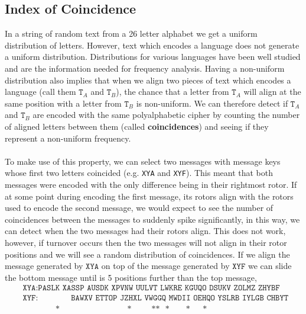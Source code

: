 \subsection{Index of Coincidence}
In a string of random text from a 26 letter alphabet we get a uniform distribution of letters. However, text which encodes a language does not generate a uniform distribution. Distributions for various languages have been well studied and are the information needed for frequency analysis. Having a non-uniform distribution also implies that when we align two pieces  of text which encodes a language (call them $\texttt{T}_A$ and $\texttt{T}_B$), the chance that a letter from $\texttt{T}_A$ will align at the same position with a letter from $\texttt{T}_B$ is non-uniform. We can therefore detect if  $\texttt{T}_A$ and $\texttt{T}_B$ are encoded with the same polyalphabetic cipher by counting the number of aligned letters between them (called {\bf{coincidences}}) and seeing if they represent a non-uniform frequency.
\\\\To make use of this property, we can select two messages with message keys whose first two letters coincided (e.g. \texttt{XYA} and \texttt{XYF}). This meant that both messages were encoded with the only difference being in their rightmost rotor. If at some point during encoding the first message, its rotors align with the rotors used to encode the second message, we would expect to see the number of coincidences between the messages to suddenly spike significantly, in this way, we can detect when the two messages had their rotors align. This does not work, however, if turnover occurs then the two messages will not align in their rotor positions and we will see a random distribution of coincidences. If we align the message generated by $\texttt{XYA}$ on top of the message generated by $\texttt{XYF}$ we can slide the bottom message until is 5 positions further than the top message,
\begin{align*}
	 & \texttt{XYA}: \texttt{PASLK XASSP AUSDK XPVNW UULVT LWKRE KGUQO DSUKV ZOLMZ ZHYBF}                                                                                                                                                      \\
	 & \texttt{XYF}: \texttt{ }\texttt{ }\texttt{ }\texttt{ }\texttt{ }\texttt{ }\texttt{BAWXV ETTOP JZHXL VWGGQ MWDII OEHQO YSLRB IYLGB CHBYT }                                                                                               \\
	 & \ \ \ \ \ \ \ \ \ \ \ \ \ \ \ \ \ \ \texttt{*}\ \ \ \ \ \ \ \ \ \ \ \ \ \ \ \ \ \ \ \ \ \ \ \ \ \ \ \ \ \ \ \ \ \ \ \ \ \texttt{*}\ \ \ \ \ \ \ \ \ \ \ \texttt{**}\ \ \ \texttt{*}\ \ \ \ \ \ \ \ \ \texttt{*}\ \ \ \ \ \ \ \texttt{*}
\end{align*}
